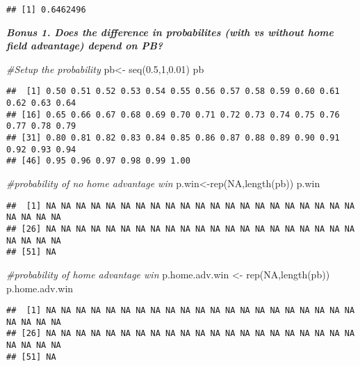 \documentclass[
]{article}
\newenvironment{Shaded}{\begin{snugshade}}{\end{snugshade}}
\newcommand{\CommentTok}[1]{\textcolor[rgb]{0.56,0.35,0.01}{\textit{#1}}}
\newcommand{\ConstantTok}[1]{\textcolor[rgb]{0.00,0.00,0.00}{#1}}
\newcommand{\DecValTok}[1]{\textcolor[rgb]{0.00,0.00,0.81}{#1}}
\newcommand{\FloatTok}[1]{\textcolor[rgb]{0.00,0.00,0.81}{#1}}
\newcommand{\FunctionTok}[1]{\textcolor[rgb]{0.00,0.00,0.00}{#1}}
\newcommand{\NormalTok}[1]{#1}
\newcommand{\OtherTok}[1]{\textcolor[rgb]{0.56,0.35,0.01}{#1}}
\begin{document}
\begin{verbatim}
## [1] 0.6462496
\end{verbatim}

\textbf{\emph{Bonus 1. Does the difference in probabilites (with vs
without home field advantage) depend on PB?}}

\begin{Shaded}
\begin{Highlighting}[]
\CommentTok{\#Setup the probability}
\NormalTok{pb}\OtherTok{\textless{}{-}} \FunctionTok{seq}\NormalTok{(}\FloatTok{0.5}\NormalTok{,}\DecValTok{1}\NormalTok{,}\FloatTok{0.01}\NormalTok{)}
\NormalTok{pb}
\end{Highlighting}
\end{Shaded}

\begin{verbatim}
##  [1] 0.50 0.51 0.52 0.53 0.54 0.55 0.56 0.57 0.58 0.59 0.60 0.61 0.62 0.63 0.64
## [16] 0.65 0.66 0.67 0.68 0.69 0.70 0.71 0.72 0.73 0.74 0.75 0.76 0.77 0.78 0.79
## [31] 0.80 0.81 0.82 0.83 0.84 0.85 0.86 0.87 0.88 0.89 0.90 0.91 0.92 0.93 0.94
## [46] 0.95 0.96 0.97 0.98 0.99 1.00
\end{verbatim}

\begin{Shaded}
\begin{Highlighting}[]
\CommentTok{\#probability of no home advantage win}
\NormalTok{p.win}\OtherTok{\textless{}{-}}\FunctionTok{rep}\NormalTok{(}\ConstantTok{NA}\NormalTok{,}\FunctionTok{length}\NormalTok{(pb))}
\NormalTok{p.win}
\end{Highlighting}
\end{Shaded}

\begin{verbatim}
##  [1] NA NA NA NA NA NA NA NA NA NA NA NA NA NA NA NA NA NA NA NA NA NA NA NA NA
## [26] NA NA NA NA NA NA NA NA NA NA NA NA NA NA NA NA NA NA NA NA NA NA NA NA NA
## [51] NA
\end{verbatim}

\begin{Shaded}
\begin{Highlighting}[]
\CommentTok{\#probability of home advantage win}
\NormalTok{p.home.adv.win }\OtherTok{\textless{}{-}} \FunctionTok{rep}\NormalTok{(}\ConstantTok{NA}\NormalTok{,}\FunctionTok{length}\NormalTok{(pb))}
\NormalTok{p.home.adv.win}
\end{Highlighting}
\end{Shaded}

\begin{verbatim}
##  [1] NA NA NA NA NA NA NA NA NA NA NA NA NA NA NA NA NA NA NA NA NA NA NA NA NA
## [26] NA NA NA NA NA NA NA NA NA NA NA NA NA NA NA NA NA NA NA NA NA NA NA NA NA
## [51] NA
\end{verbatim}
\end{document}
